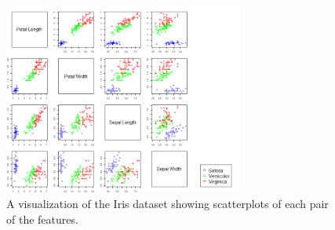 \documentclass{article}
\begin{document}
\begin{figure}[H]
	\centering
	\includegraphics[width=0.7\textwidth]{iris_colored.png}
	\caption{A visualization of the Iris dataset showing scatterplots of each pair
	of the features.}
	\label{fig:iris_colored}
\end{figure}
\end{document}
